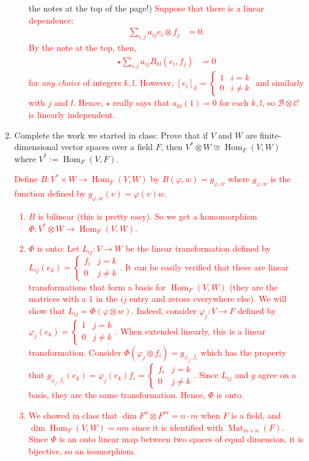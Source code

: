 \documentclass[12pt]{article}
\newcommand{\calB}{\mathcal{B}}
\newcommand{\calC}{\mathcal{C}}
\newcommand{\Hom}{\operatorname{Hom}}
\newcommand{\solution}[1]{\textcolor{red}{#1}}
\begin{document}
\begin{enumerate}
\begin{itemize}
    the notes at the top of the page!)
\solution{
Suppose that there is a linear dependence:
\begin{align*}
  \sum\limits_{i,j} a_{ij} e_i \otimes f_j &= 0.
\end{align*}
By the note at the top, then,
\begin{align*}
\star  \sum\limits_{i,j} a_{ij} B_{kl}(e_i,f_j) &= 0
\end{align*}
for \emph{any choice} of integers $k,l$. However, $[e_i]_k
= \begin{cases} 1 & i=k\\ 0 & i\neq k\end{cases}$ and similarly with
$j$ and $l$. Hence, $\star$ really says that $a_{kl} (1) =0$ for each
$k,l$, so $\calB\otimes \calC$ is linearly independent. }

    \end{itemize}
  \item Complete the work we started in class: Prove that if $V$ and
    $W$ are finite-dimensional vector spaces over a field $F$, then $V^*\otimes W \cong
    \Hom_F(V,W)$ where $V^*:=\Hom_F(V,F)$.
\solution{
Define $B: V^* \times W\rightarrow \Hom_F(V, W)$ by $B(\varphi,
w)=g_{\varphi,w}$ where $g_{\varphi,w}$ is the function defined by
$g_{\varphi, w}(v) = \varphi(v)w$.
\begin{enumerate}
\item $B$ is bilinear (this is pretty easy). So we get a homomorphism
  $\Phi: V^*\otimes W \rightarrow \Hom_F(V, W)$. 
\item $\Phi$ is onto: Let $L_{ij}: V\rightarrow W$ be the linear
  transformation defined by $L_{ij}(e_k) = \begin{cases} f_i & j=k\\ 0
    & j\neq k\end{cases}$. It can be easily verified that these are
  linear transformations that form a
  basis for $\Hom_F(V,W)$ (they are the matrices with a 1 in the $ij$
  entry and zeroes everywhere else). We will show that
  $L_{ij}=\Phi(\varphi\otimes w).$ Indeed, consider $\varphi_j:
  V\rightarrow F$ defined by $\varphi_j(e_k) = \begin{cases} 1 & j=k
    \\ 0 & j\neq k\end{cases}.$ When extended linearly, this is a
  linear transformation. Consider $\Phi(\varphi_j \otimes f_i) =
  g_{\varphi_j, f_i}$ which has the property that
  $g_{\varphi_j,f_i}(e_k) = \varphi_j(e_k) f_i = \begin{cases} f_i &
    j=k\\ 0 & j\neq k \end{cases}. $ Since $L_{ij}$ and $g$ agree on a
  basis, they are the same transformation. Hence, $\Phi$ is onto. 
\item We showed in class that $\dim F^n \otimes F^m = n\cdot m$ when
  $F$ is a field, and $\dim \Hom_F(V,W)=nm$ since it is identified
  with $\operatorname{Mat}_{m\times n} (F)$. Since $\Phi$ is an onto
  linear map between two spaces of equal dimension, it is bijective,
  so an isomorphism.
\end{enumerate}}

 \end{enumerate}
\end{document}
